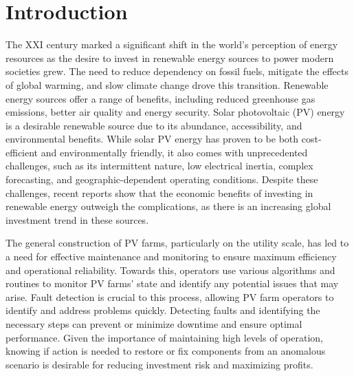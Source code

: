 \chapter{Introduction} \label{chap:chap1}


The XXI century marked a significant shift in the world's perception of energy resources as the desire to invest in renewable energy sources to power modern societies grew. The need to reduce dependency on fossil fuels, mitigate the effects of global warming, and slow climate change drove this transition. Renewable energy sources offer a range of benefits, including reduced greenhouse gas emissions, better air quality and energy security. Solar photovoltaic (PV) energy is a desirable renewable source due to its abundance, accessibility, and environmental benefits. While solar PV energy has proven to be both cost-efficient and environmentally friendly, it also comes with unprecedented challenges, such as its intermittent nature, low electrical inertia, complex forecasting, and geographic-dependent operating conditions. Despite these challenges, recent reports \cite{cap} show that the economic benefits of investing in renewable energy outweigh the complications, as there is an increasing global investment trend in these sources.

The general construction of PV farms, particularly on the utility scale, has led to a need for effective maintenance and monitoring to ensure maximum efficiency and operational reliability. Towards this, operators use various algorithms and routines to monitor PV farms' state and identify any potential issues that may arise. Fault detection is crucial to this process, allowing PV farm operators to identify and address problems quickly. Detecting faults and identifying the necessary steps can prevent or minimize downtime and ensure optimal performance. Given the importance of maintaining high levels of operation, knowing if action is needed to restore or fix components from an anomalous scenario is desirable for reducing investment risk and maximizing profits.

